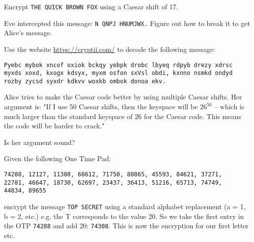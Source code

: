 \documentclass[11pt,a4paper]{report}
\begin{document}
\begin{ex}
Encrypt \verb|THE QUICK BROWN FOX| using a Caesar shift of 17.
\end{ex}


\begin{ex}
Eve intercepted this message: \verb|N QNPJ HNUMJWX.| Figure out how to break it to get Alice’s message.
\end{ex}


\begin{ex}
Use the website \url{https://cryptii.com/} to decode the following message:
\begin{verbatim}
Pyebc mybok xncof oxiok bckqy yebpk drobc lbyeq rdpyb drezy xdrsc
myxds xoxd, kxogx kdsyx, myxm osfon sxVsl obdi, kxnno nsmkd ondyd
rozby zycsd syxdr kdkvv woxkb ombok donoa ekv.
\end{verbatim}
\end{ex}

\begin{ex}
Alice tries to make the Caesar code better by using multiple Caesar shifts. Her argument is: "If I use 50 Caesar shifts,  then the keyspace will be $26^{50}$ -- which is much larger than the standard keyspace of 26 for the Caesar code.  This means the code will be harder to crack." 

Is her argument sound?
\end{ex}




\begin{ex}
Given the following One Time Pad: 
\begin{verbatim}
74288, 12127, 11380, 68612, 71750, 80865, 45593, 84621, 37271,
22781, 46647, 18730, 62697, 23437, 36413, 51216, 65713, 74749,
44834, 89655
\end{verbatim}
encrypt the message \verb|TOP SECRET| using a standard alphabet replacement (a = 1, b = 2, etc.) e.g. the T corresponds to the value $20$. So we take the first entry in the OTP \verb|74288| and add 20: \verb|74308|. This is now the encryption for our first letter etc.
\end{ex}
\end{document}
